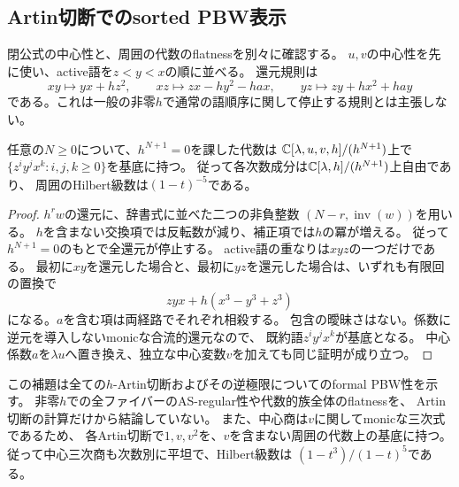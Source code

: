 \subsection{Artin切断でのsorted PBW表示}

閉公式の中心性と、周囲の代数のflatnessを別々に確認する。
$u,v$の中心性を先に使い、active語を$z<y<x$の順に並べる。
還元規則は
\begin{equation}\label{mt:eq:rewrite}
 xy\longmapsto yx+hz^2,\qquad
 xz\longmapsto zx-hy^2-hax,\qquad
 yz\longmapsto zy+hx^2+hay
\end{equation}
である。これは一般の非零$h$で通常の語順序に関して停止する規則とは主張しない。

\begin{lemma}[全Artin切断でのPBW性]
\label{mt:lem:artin-pbw}
任意の$N\ge0$について、$h^{N+1}=0$を課した代数は
$\mathbb C[\lambda,u,v,h]/(h^{N+1})$上で
$\{z^iy^jx^k:i,j,k\ge0\}$を基底に持つ。
従って各次数成分は$\mathbb C[\lambda,h]/(h^{N+1})$上自由であり、
周囲のHilbert級数は$(1-t)^{-5}$である。
\end{lemma}
\begin{proof}
$h^r w$の還元に、辞書式に並べた二つの非負整数
$(N-r,\operatorname{inv}(w))$を用いる。
$h$を含まない交換項では反転数が減り、補正項では$h$の冪が増える。
従って$h^{N+1}=0$のもとで全還元が停止する。
active語の重なりは$xyz$の一つだけである。
最初に$xy$を還元した場合と、最初に$yz$を還元した場合は、いずれも有限回の置換で
\begin{equation}\label{mt:eq:overlap}
 zyx+h(x^3-y^3+z^3)
\end{equation}
になる。$a$を含む項は両経路でそれぞれ相殺する。
包含の曖昧さはない。係数に逆元を導入しないmonicな合流的還元なので、
既約語$z^iy^jx^k$が基底となる。
中心係数$a$を$\lambda u$へ置き換え、独立な中心変数$v$を加えても同じ証明が成り立つ。
\end{proof}

この補題は全ての$h$-Artin切断およびその逆極限についてのformal PBW性を示す。
非零$h$での全ファイバーのAS-regular性や代数的族全体のflatnessを、
Artin切断の計算だけから結論していない。
また、中心商は$v$に関してmonicな三次式であるため、
各Artin切断で$1,v,v^2$を、$v$を含まない周囲の代数上の基底に持つ。
従って中心三次商も次数別に平坦で、Hilbert級数は
$(1-t^3)/(1-t)^5$である。


